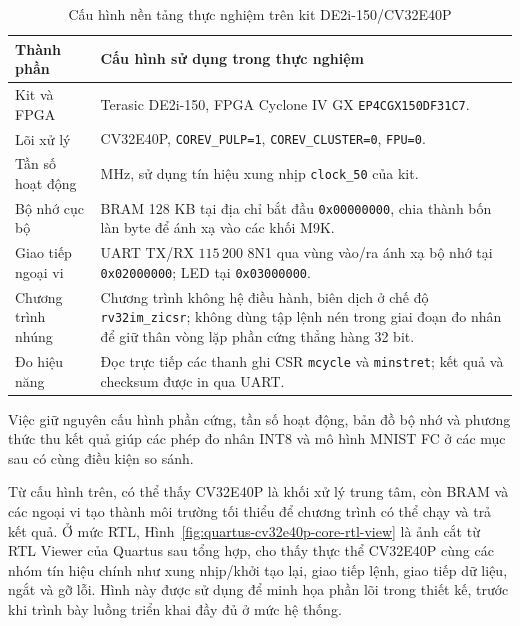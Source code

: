 \documentclass[../DoAn.tex]{subfiles}
\begin{document}
\begin{table}[H]
    \centering
    \footnotesize
    \renewcommand{\arraystretch}{1.00}
    \begin{tabular}{|>{\raggedright\arraybackslash}p{3.45cm}|>{\raggedright\arraybackslash}p{9.20cm}|}
        \hline
        \textbf{Thành phần} & \textbf{Cấu hình sử dụng trong thực nghiệm} \\
        \hline
        Kit và FPGA & Terasic DE2i-150, FPGA Cyclone IV GX \texttt{EP4CGX150DF31C7}. \\
        \hline
        Lõi xử lý & CV32E40P, \texttt{COREV\_PULP=1}, \texttt{COREV\_CLUSTER=0}, \texttt{FPU=0}. \\
        \hline
        Tần số hoạt động & 50 MHz, sử dụng tín hiệu xung nhịp \texttt{clock\_50} của kit. \\
        \hline
        Bộ nhớ cục bộ & BRAM 128 KB tại địa chỉ bắt đầu \texttt{0x00000000}, chia thành bốn làn byte để ánh xạ vào các khối M9K. \\
        \hline
        Giao tiếp ngoại vi & UART TX/RX \(115\,200\) 8N1 qua vùng vào/ra ánh xạ bộ nhớ tại \texttt{0x02000000}; LED tại \texttt{0x03000000}. \\
        \hline
        Chương trình nhúng & Chương trình không hệ điều hành, biên dịch ở chế độ \texttt{rv32im\_zicsr}; không dùng tập lệnh nén trong giai đoạn đo nhân để giữ thân vòng lặp phần cứng thẳng hàng 32 bit. \\
        \hline
        Đo hiệu năng & Đọc trực tiếp các thanh ghi CSR \texttt{mcycle} và \texttt{minstret}; kết quả và checksum được in qua UART. \\
        \hline
    \end{tabular}
    \caption{Cấu hình nền tảng thực nghiệm trên kit DE2i-150/CV32E40P}
    \label{tab:de2i150-experiment-platform}
\end{table}

Việc giữ nguyên cấu hình phần cứng, tần số hoạt động, bản đồ bộ nhớ và phương thức thu kết quả giúp các phép đo nhân INT8 và mô hình MNIST FC ở các mục sau có cùng điều kiện so sánh.

Từ cấu hình trên, có thể thấy CV32E40P là khối xử lý trung tâm, còn BRAM và các ngoại vi tạo thành môi trường tối thiểu để chương trình có thể chạy và trả kết quả. Ở mức RTL, Hình~\ref{fig:quartus-cv32e40p-core-rtl-view} là ảnh cắt từ RTL Viewer của Quartus sau tổng hợp, cho thấy thực thể CV32E40P cùng các nhóm tín hiệu chính như xung nhịp/khởi tạo lại, giao tiếp lệnh, giao tiếp dữ liệu, ngắt và gỡ lỗi. Hình này được sử dụng để minh họa phần lõi trong thiết kế, trước khi trình bày luồng triển khai đầy đủ ở mức hệ thống.
\end{document}
